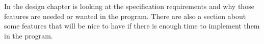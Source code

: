 In the design chapter is looking at the specification requirements and why those features are needed or wanted in the program. There are also a section about some features that will be nice to have if there is enough time to implement them in the program.